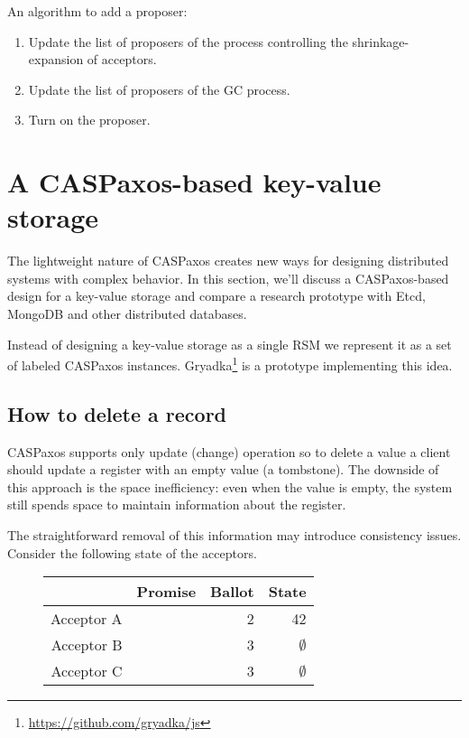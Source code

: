 \documentclass[12pt]{article}
\theoremstyle{definition}
\begin{document}
An algorithm to add a proposer:

\begin{enumerate}
  \item Update the list of proposers of the process controlling the shrinkage-expansion of acceptors.
  \item Update the list of proposers of the GC process.
  \item Turn on the proposer.
\end{enumerate}

\section{A CASPaxos-based key-value storage}

The lightweight nature of CASPaxos creates new ways for designing distributed systems with complex behavior. In this section, we'll discuss a CASPaxos-based design for a key-value storage and compare a research prototype with Etcd, MongoDB and other distributed databases.

Instead of designing a key-value storage as a single RSM we represent it as a set of labeled CASPaxos instances. Gryadka\footnote{\href{https://github.com/gryadka/js}{https://github.com/gryadka/js}} is a prototype implementing this idea.

\subsection{How to delete a record}\label{deletion}

CASPaxos supports only update (change) operation so to delete a value a client should update a register with an empty value (a tombstone). The downside of this approach is the space inefficiency: even when the value is empty, the system still spends space to maintain information about the register.

The straightforward removal of this information may introduce consistency issues. Consider the following state of the acceptors.

\begin{figure}[!h]
  \centering
  \begin{tabular}{ r|r|r|r }
    & Promise & Ballot & State \\ \hline
    Acceptor A && 2 & 42 \\
    Acceptor B && 3 & $\emptyset$ \\
    Acceptor C && 3 & $\emptyset$ \\
  \end{tabular}
\end{figure}
\end{document}
